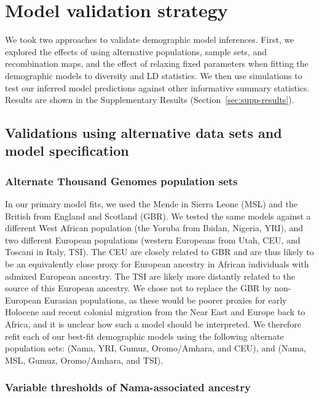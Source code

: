 \documentclass[]{article}
\begin{document}
\section{Model validation strategy}
\label{sec:validation_strategy}
We took two approaches to validate demographic model inferences. First, we
explored the effects of using alternative populations, sample sets, and
recombination maps, and the effect of relaxing fixed parameters when fitting
the demographic models to diversity and LD statistics. We then use simulations
to test our inferred model predictions against other informative summary
statistics. Results are shown in the Supplementary Results
(Section~\ref{sec:supp-results}).

\subsection{Validations using alternative data sets and model specification}
\label{sec:validation-data-models}

\subsubsection{Alternate Thousand Genomes population sets}

In our primary model fits, we used the Mende in Sierra Leone (MSL) and the
British from England and Scotland (GBR). We tested the same models against a
different West African population (the Yoruba from Ibidan, Nigeria, YRI), and
two different European populations (western Europeans from Utah, CEU, and
Toscani in Italy, TSI). The CEU are closely related to GBR and are thus likely
to be an equivalently close proxy for European ancestry in African individuals
with admixed European ancestry. The TSI are likely more distantly related to
the source of this European ancestry. We chose not to replace the GBR
by non-European Eurasian populations, as these would be poorer proxies for early
Holocene and recent colonial migration from the Near East and Europe back to
Africa, and it is unclear how such a model should be interpreted. We therefore
refit each of our best-fit demographic models using the following alternate
population sets: (Nama, YRI, Gumuz, Oromo/Amhara, and CEU), and (Nama, MSL,
Gumuz, Oromo/Amhara, and TSI).

\subsubsection{Variable thresholds of Nama-associated ancestry}
\end{document}
